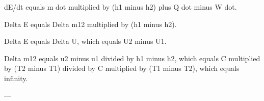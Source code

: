 dE/dt equals m dot multiplied by (h1 minus h2) plus Q dot minus W dot.  

Delta E equals Delta m12 multiplied by (h1 minus h2).  

Delta E equals Delta U, which equals U2 minus U1.  

Delta m12 equals u2 minus u1 divided by h1 minus h2, which equals C multiplied by (T2 minus T1) divided by C multiplied by (T1 minus T2), which equals infinity.  

---